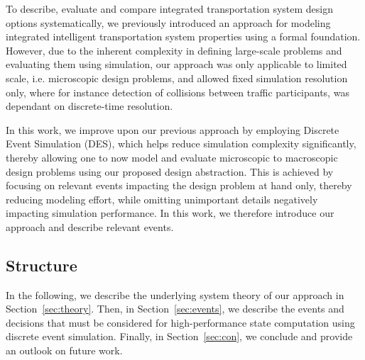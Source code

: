 \documentclass[graybox]{svmult}
\begin{document}
To describe, evaluate and compare integrated transportation system design options systematically, we previously introduced an approach for modeling integrated intelligent transportation system properties using a formal foundation. However, due to the inherent complexity in defining large-scale problems and evaluating them using simulation, our approach was only applicable to limited scale, i.e. microscopic design problems, and allowed fixed simulation resolution only, where for instance detection of collisions between traffic participants, was dependant on discrete-time resolution.  

In this work, we improve upon our previous approach by employing Discrete Event Simulation (DES), which helps reduce simulation complexity significantly, thereby allowing one to now model and evaluate microscopic to macroscopic design problems using our proposed design abstraction. This is achieved by focusing on relevant events impacting the design problem at hand only, thereby reducing modeling effort, while omitting unimportant details negatively impacting simulation performance. In this work, we therefore introduce our approach and describe relevant events. 
\vspace{-2mm}

\subsection{Structure}
In the following, we describe the underlying system theory of our approach in Section~\ref{sec:theory}.
Then, in Section~\ref{sec:events}, we describe the events and decisions that must be considered for high-performance state computation using discrete event simulation. 
Finally, in Section~\ref{sec:con}, we conclude and provide an outlook on future work.
\vspace{-2mm}
\end{document}
